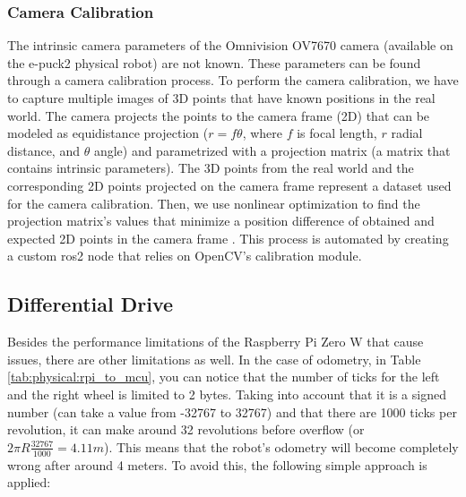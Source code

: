 \subsubsection{Camera Calibration}
The intrinsic camera parameters of the Omnivision OV7670 camera (available on the e-puck2 physical robot) are not known.
These parameters can be found through a camera calibration process.
To perform the camera calibration, we have to capture multiple images of 3D points that have known positions in the real world.
The camera projects the points to the camera frame (2D) that can be modeled as equidistance projection ($r = f\theta$, where $f$ is focal length, $r$ radial distance, and $\theta$ angle) and parametrized with a projection matrix (a matrix that contains intrinsic parameters).
The 3D points from the real world and the corresponding 2D points projected on the camera frame represent a dataset used for the camera calibration.
Then, we use nonlinear optimization to find the projection matrix's values that minimize a position difference of obtained and expected 2D points in the camera frame \cite{lukic_dual_nodate}. 
This process is automated by creating a custom \ac{ros2} node that relies on OpenCV's calibration module.

\subsection{Differential Drive}
Besides the performance limitations of the Raspberry Pi Zero W that cause issues, there are other limitations as well. In the case of odometry, in Table \ref{tab:physical:rpi_to_mcu}, you can notice that the number of ticks for the left and the right wheel is limited to 2 bytes. Taking into account that it is a signed number (can take a value from -32767 to 32767) and that there are 1000 ticks per revolution, it can make around 32 revolutions before overflow (or $ 2 \pi R \frac{32767}{1000} = 4.11m $). This means that the robot's odometry will become completely wrong after around 4 meters. To avoid this, the following simple approach is applied:

